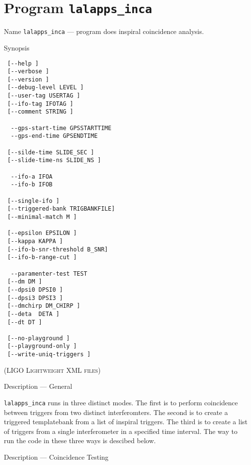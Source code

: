 \section{Program \texttt{lalapps\_inca}}
\label{program:lalapps-inca}

\begin{entry}
\item[Name]
\verb$lalapps_inca$ --- program does inspiral coincidence analysis.

\item[Synopsis]
\begin{verbatim}
 [--help ] 
 [--verbose ]
 [--version ] 
 [--debug-level LEVEL ]
 [--user-tag USERTAG ]
 [--ifo-tag IFOTAG ]
 [--comment STRING ] 
 
  --gps-start-time GPSSTARTTIME      
  --gps-end-time GPSENDTIME       
 
 [--silde-time SLIDE_SEC ]
 [--slide-time-ns SLIDE_NS ] 
 
  --ifo-a IFOA              
  --ifo-b IFOB             
 
 [--single-ifo ]
 [--triggered-bank TRIGBANKFILE]
 [--minimal-match M ]
 
 [--epsilon EPSILON ]
 [--kappa KAPPA ]
 [--ifo-b-snr-threshold B_SNR]
 [--ifo-b-range-cut ]
 
  --paramenter-test TEST   
 [--dm DM ]  
 [--dpsi0 DPSI0 ]
 [--dpsi3 DPSI3 ]
 [--dmchirp DM_CHIRP ]
 [--deta  DETA ]
 [--dt DT ]
 
 [--no-playground ]
 [--playground-only ]
 [--write-uniq-triggers ]

\end{verbatim}

\textsc{(LIGO Lightweight XML files)}

\item[Description --- General] 

\verb$lalapps_inca$ runs in three distinct modes.  The first is to
perform coincidence between triggers from two distinct interferomters.
The second is to create a triggered templatebank from a list of inspiral
triggers.  The third is to create a list of triggers from a single
interferometer in a specified time interval.  The way to run the code in
these three ways is descibed below.


\item[Description --- Coincidence Testing]


\end{entry}
